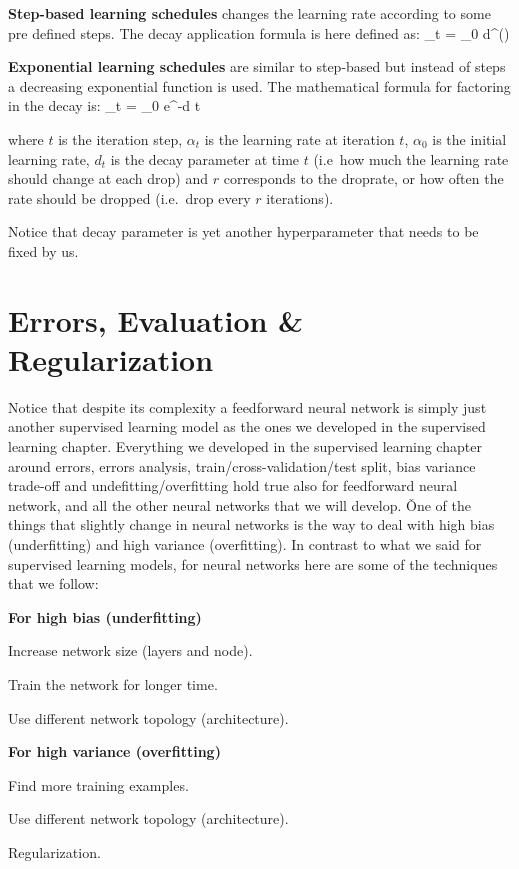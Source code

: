 \item \textbf{Step-based learning schedules} changes the learning rate according to some pre defined steps. The decay
application formula is here defined as:
\bse
\alpha_t = \alpha_{0} \cdot d^{()}
\ese

\item \textbf{Exponential learning schedules} are similar to step-based but instead of steps a decreasing exponential
function is used. The mathematical formula for factoring in the decay is:
\bse
\alpha _{t} = \alpha _{0} \cdot e^{-d \cdot t}
\ese

where $t$ is the iteration step, $\alpha_t$ is the learning rate at iteration $t$, $\alpha_0$ is the initial learning
rate, $d_t$ is the decay parameter at time $t$ (i.e\ how much the learning rate should change at each drop) and $r$ 
corresponds to the droprate, or how often the rate should be dropped (i.e.\ drop every $r$ iterations). 
\eit

Notice that decay parameter is yet another hyperparameter that needs to be fixed by us.

\section{Errors, Evaluation \& Regularization}

Notice that despite its complexity a feedforward neural network is simply just another supervised learning model as 
the ones we developed in the supervised learning chapter. Everything we developed in the supervised learning chapter 
around errors, errors analysis, train/cross-validation/test split, bias variance trade-off and 
undefitting/overfitting hold true also for feedforward neural network, and all the other neural networks that we will
develop. \v

One of the things that slightly change in neural networks is the way to deal with high bias (underfitting) and high 
variance (overfitting). In contrast to what we said for supervised learning models, for neural networks here are some
of the techniques that we follow:
\bit
\item \textbf{For high bias (underfitting)}
\bit
\item Increase network size (layers and node).
\item Train the network for longer time.
\item Use different network topology (architecture).
\eit
\item \textbf{For high variance (overfitting)}
\bit
\item Find more training examples.
\item Use different network topology (architecture).
\item Regularization.
\eit
\eit

